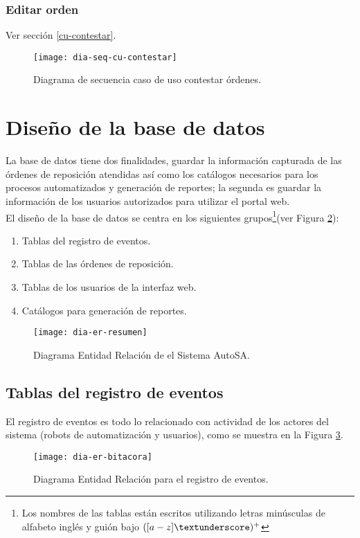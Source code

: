 \subsubsection{Editar orden}
Ver sección \ref{cu-contestar}.\\
\begin{figure}[h]
	\centering
	\texttt{[image: dia-seq-cu-contestar]}
	\caption{Diagrama de secuencia caso de uso contestar órdenes.}
	\label{fig:dia-seq-cu-contestar}
\end{figure}
\fi




\section{Diseño de la base de datos}
La base de datos tiene dos finalidades, guardar la información capturada de las órdenes de reposición atendidas así como los catálogos necesarios para los procesos automatizados y generación de reportes; la segunda es guardar la información de los usuarios autorizados para utilizar el portal web.\\
El diseño de la base de datos se centra en los siguientes grupos\footnote{Los nombres de las tablas están escritos utilizando letras minúsculas de alfabeto inglés y guión bajo $([a-z]{\textunderscore})^+$}(ver Figura \ref{fig:dia-er-resumen}):
\begin{enumerate}
	\item Tablas del registro de eventos.
	\item Tablas de las órdenes de reposición.
	\item Tablas de los usuarios de la interfaz web.
	\item Catálogos para generación de reportes.
\end{enumerate}
\begin{figure}[h]
  \centering
  \texttt{[image: dia-er-resumen]}
  \caption{Diagrama Entidad Relación de el Sistema AutoSA.}
  \label{fig:dia-er-resumen}
\end{figure}

\subsection{Tablas del registro de eventos}
El registro de eventos es todo lo relacionado con actividad de los actores del sistema (robots de automatización y usuarios), como se muestra en la Figura \ref{fig:dia-er-bitacora}.
\begin{figure}[h]
  \centering
  \texttt{[image: dia-er-bitacora]} 
  \caption{Diagrama Entidad Relación para el registro de eventos.}
  \label{fig:dia-er-bitacora}
\end{figure}
